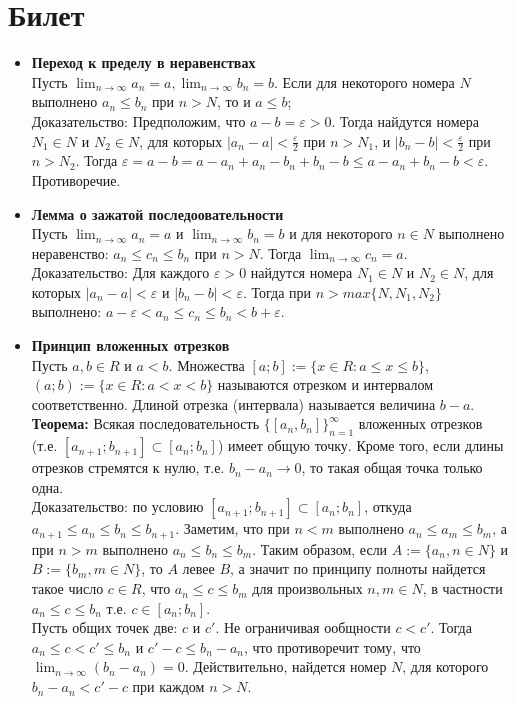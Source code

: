\documentclass[12pt,a4paper]{article}
\begin{document}
\section{Билет}
\begin{itemize}
\item \textbf{Переход к пределу в неравенствах} \\
Пусть $\lim_{n \to \infty}{a_n = a}, \lim_{n \to \infty}{b_n = b}$. Если для некоторого номера $N$ выполнено $a_n \leq b_n$ при $n > N$, то и $a \leq b$; \\
Доказательство: Предположим, что $a-b = \varepsilon > 0$. Тогда найдутся номера $N_1 \in N$ и $N_2 \in N$, для которых $|a_n - a| < \frac{\varepsilon}{2}$ при $n > N_1$, и $|b_n-b| < \frac{\varepsilon}{2}$ при $n > N_2$. Тогда $\varepsilon = a - b = a - a_n + a_n - b_n + b_n - b \leq a - a_n + b_n - b < \varepsilon$. Противоречие. 

\item \textbf{ Лемма о зажатой последоовательности} \\
Пусть $\lim_{n \to \infty}{a_n = a}$ и $\lim_{n \to \infty}{b_n = b}$ и для некоторого $n \in N$ выполнено неравенство: $a_n \leq c_n \leq b_n$ при $n > N$. Тогда $\lim_{n \to \infty}{c_n = a}$. \\
Доказательство: Для каждого $\varepsilon > 0$ найдутся номера $N_1 \in N$ и $N_2 \in N$, для которых $|a_n - a| < \varepsilon$ и $|b_n - b| < \varepsilon$. Тогда при $n > max\{N, N_1, N_2\}$ выполнено: $a - \varepsilon < a_n \leq c_n \leq b_n < b + \varepsilon$.

\item \textbf{Принцип вложенных отрезков} \\
Пусть $a, b \in R$ и $a < b$. Множества $[a; b] := \{x \in R: a \leq x \leq b\}$, $(a;b) := \{ x \in R: a < x < b \}$ называются отрезком и интервалом соответственно. Длиной отрезка (интервала) называется величина $b - a$. \\
\textbf{Теорема:} Всякая последовательность $\{[a_n, b_n]\}_{n=1}^{\infty}$ вложенных отрезков (т.е. $[a_{n+1};b_{n+1}] \subset [a_{n};b_{n}]$) имеет общую точку. Кроме того, если длины отрезков стремятся к нулю, т.е. $b_n - a_n \longrightarrow 0$, то такая общая точка только одна. \\
Доказательство: по условию $[a_{n+1}; b_{n+1}] \subset [a_{n}; b_{n}]$, откуда $a_{n+1} \leq a_n \leq b_n \leq b_{n+1}$. Заметим, что при $n < m$ выполнено $a_n \leq a_m \leq b_m$, а при $n > m$ выполнено $a_n \leq b_n \leq b_m$. Таким образом, если $A :=\{a_n, n \in N\}$ и $B := \{b_m, m \in N\}$, то $A$ левее $B$, а значит по принципу полноты найдется такое число $c \in R$, что $a_n \leq c \leq b_m$ для произвольных $n, m \in N$, в частности $a_n \leq c \leq b_n$ т.е. $c \in [a_n; b_n]$. \\
Пусть общих точек две: $c$ и $c'$. Не ограничивая ообщности $c < c'$. Тогда $a_n \leq c < c' \leq b_n$ и $c' - c \leq b_n - a_n$, что противоречит тому, что $\lim_{n \to \infty}{(b_n - a_n)} = 0$. Действительно, найдется номер $N$, для которого $b_n - a_n < c' - c$ при каждом $n > N$.


\end{itemize}
\end{document}
